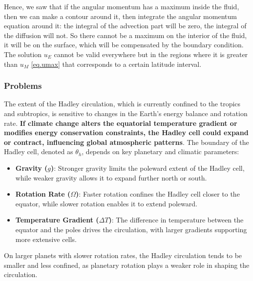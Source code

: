 Hence, we saw that if the angular momentum has a maximum inside the fluid, then we can make a contour around it, then integrate the angular momentum equation around it: the integral of the advection part will be zero, the integral of the diffusion will not. So there cannot be a maximum on the interior of the fluid, it will be on the surface, which will be compensated by the boundary condition. The solution $u_E$ cannot be valid everywhere but in the regions where it is greater than $u_M$ \ref{eq.umax} that corresponds to a certain latitude interval.

\subsubsection{Problems}
The extent of the Hadley circulation, which is currently confined to the tropics and subtropics, is sensitive to changes in the Earth's energy balance and rotation rate. \textbf{If climate change alters the equatorial temperature gradient or modifies energy conservation constraints, the Hadley cell could expand or contract, influencing global atmospheric patterns}.
The boundary of the Hadley cell, denoted as $\theta_h$, depends on key planetary and climatic parameters:

\begin{itemize}
	\item \textbf{Gravity ($g$)}: Stronger gravity limits the poleward extent of the Hadley cell, while weaker gravity allows it to expand further north or south.
	\item \textbf{Rotation Rate ($\Omega$)}: Faster rotation confines the Hadley cell closer to the equator, while slower rotation enables it to extend poleward.
	\item \textbf{Temperature Gradient ($\Delta T$)}: The difference in temperature between the equator and the poles drives the circulation, with larger gradients supporting more extensive cells.
\end{itemize}
On larger planets with slower rotation rates, the Hadley circulation tends to be smaller and less confined, as planetary rotation plays a weaker role in shaping the circulation.\\
[0.25cm]


